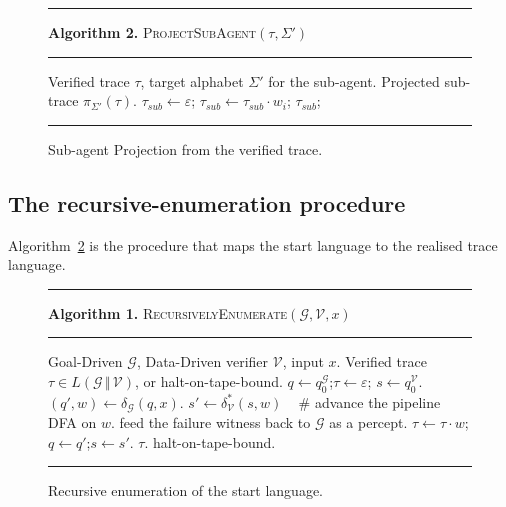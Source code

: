 \begin{figure}[ht]
\noindent\rule{\columnwidth}{0.4pt}
\textbf{Algorithm 2.} \textsc{ProjectSubAgent}$(\tau, \Sigma')$
\par\noindent\rule{\columnwidth}{0.4pt}
\begin{algorithmic}[1]
\REQUIRE Verified trace $\tau$, target alphabet $\Sigma'$ for the sub-agent.
\ENSURE Projected sub-trace $\pi_{\Sigma'}(\tau)$.
\STATE $\tau_{sub} \gets \varepsilon$;
    \STATE $\tau_{sub} \gets \tau_{sub} \cdot w_i$;
  \ENDIF
\ENDFOR
\RETURN $\tau_{sub}$;
\end{algorithmic}
\rule{\columnwidth}{0.4pt}
\caption{Sub-agent Projection from the verified trace.}
\label{alg:projection}
\end{figure}

\subsection{The recursive-enumeration procedure}

Algorithm~\ref{alg:enum} is the procedure that maps the start
language to the realised trace language.

\begin{figure}[ht]
\noindent\rule{\columnwidth}{0.4pt}
\textbf{Algorithm 1.} \textsc{RecursivelyEnumerate}$(\mathcal{G},
\mathcal{V}, x)$
\par\noindent\rule{\columnwidth}{0.4pt}
\begin{algorithmic}[1]
\REQUIRE Goal-Driven $\mathcal{G}$, Data-Driven verifier
$\mathcal{V}$, input $x$.
\ENSURE Verified trace $\tau\in L(\mathcal{G}\,\Vert\,\mathcal{V})$,
or \textsf{halt-on-tape-bound}.
\STATE $q\gets q_0^\mathcal{G}$;\quad $\tau\gets\varepsilon$;\quad
$s\gets q_0^\mathcal{V}$.
\LOOP
  \STATE $(q', w) \gets \delta_\mathcal{G}(q, x)$.
  \STATE $s' \gets \delta_\mathcal{V}^*(s, w)$ \,\,\,\,\,\#
       advance the pipeline DFA on $w$.
    \STATE feed the failure witness back to $\mathcal{G}$
    as a percept.
  \ELSE
    \STATE $\tau \gets \tau\cdot w$;\quad $q\gets q'$;\quad $s\gets s'$.
      \RETURN $\tau$.
    \ENDIF
  \ENDIF
    \RETURN \textsf{halt-on-tape-bound}.
  \ENDIF
\ENDLOOP
\end{algorithmic}
\rule{\columnwidth}{0.4pt}
\caption{Recursive enumeration of the start language.}
\label{alg:enum}
\end{figure}

